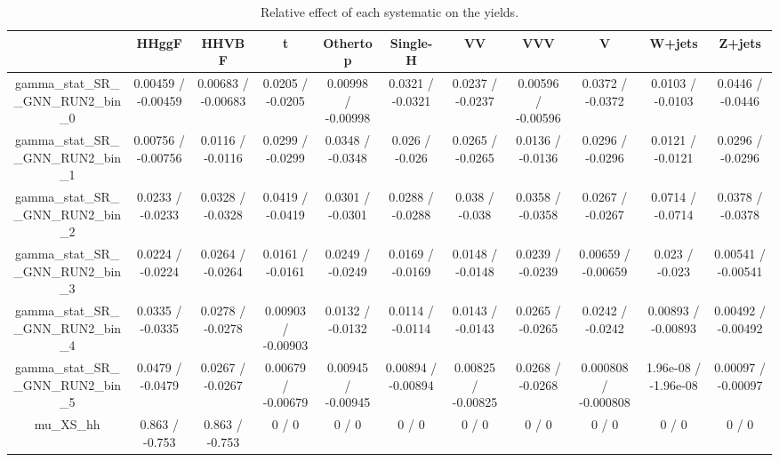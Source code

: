 \documentclass[10pt]{article}
\begin{document}
\begin{table}[htbp]
\begin{center}
\begin{tabular}{|c|c|c|c|c|c|c|c|c|c|c|}
\hline 
      & HHggF      & HHVBF      & t      & Othertop      & Single-H      & VV      & VVV      & V      & W+jets      & Z+jets \\ 
\hline 
  gamma_stat_SR__GNN_RUN2_bin_0 & 0.00459 / -0.00459 & 0.00683 / -0.00683 & 0.0205 / -0.0205 & 0.00998 / -0.00998 & 0.0321 / -0.0321 & 0.0237 / -0.0237 & 0.00596 / -0.00596 & 0.0372 / -0.0372 & 0.0103 / -0.0103 & 0.0446 / -0.0446 \\ 
  gamma_stat_SR__GNN_RUN2_bin_1 & 0.00756 / -0.00756 & 0.0116 / -0.0116 & 0.0299 / -0.0299 & 0.0348 / -0.0348 & 0.026 / -0.026 & 0.0265 / -0.0265 & 0.0136 / -0.0136 & 0.0296 / -0.0296 & 0.0121 / -0.0121 & 0.0296 / -0.0296 \\ 
  gamma_stat_SR__GNN_RUN2_bin_2 & 0.0233 / -0.0233 & 0.0328 / -0.0328 & 0.0419 / -0.0419 & 0.0301 / -0.0301 & 0.0288 / -0.0288 & 0.038 / -0.038 & 0.0358 / -0.0358 & 0.0267 / -0.0267 & 0.0714 / -0.0714 & 0.0378 / -0.0378 \\ 
  gamma_stat_SR__GNN_RUN2_bin_3 & 0.0224 / -0.0224 & 0.0264 / -0.0264 & 0.0161 / -0.0161 & 0.0249 / -0.0249 & 0.0169 / -0.0169 & 0.0148 / -0.0148 & 0.0239 / -0.0239 & 0.00659 / -0.00659 & 0.023 / -0.023 & 0.00541 / -0.00541 \\ 
  gamma_stat_SR__GNN_RUN2_bin_4 & 0.0335 / -0.0335 & 0.0278 / -0.0278 & 0.00903 / -0.00903 & 0.0132 / -0.0132 & 0.0114 / -0.0114 & 0.0143 / -0.0143 & 0.0265 / -0.0265 & 0.0242 / -0.0242 & 0.00893 / -0.00893 & 0.00492 / -0.00492 \\ 
  gamma_stat_SR__GNN_RUN2_bin_5 & 0.0479 / -0.0479 & 0.0267 / -0.0267 & 0.00679 / -0.00679 & 0.00945 / -0.00945 & 0.00894 / -0.00894 & 0.00825 / -0.00825 & 0.0268 / -0.0268 & 0.000808 / -0.000808 & 1.96e-08 / -1.96e-08 & 0.00097 / -0.00097 \\ 
  mu_XS_hh & 0.863 / -0.753 & 0.863 / -0.753 & 0 / 0 & 0 / 0 & 0 / 0 & 0 / 0 & 0 / 0 & 0 / 0 & 0 / 0 & 0 / 0 \\ 
\hline 
\end{tabular} 
\caption{Relative effect of each systematic on the yields.} 
\end{center} 
\end{table} 
\end{document}
